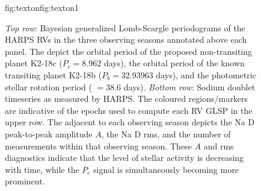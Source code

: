\begin{figure}
\begin{ocg}{fig:texton}{fig:texton}{1}
  \end{ocg}
  \hspace{-\hsize}%
  \caption[Temporal variations in the probability of the periodic signal at $P_c=8.962$ days and HARPS Na D timeseries
    over three observing seasons.]
    {\small \emph{Top row}: Bayesian generalized Lomb-Scargle periodograms of the HARPS RVs in the three observing
    seasons annotated above each panel. The
     depict
    the orbital period of the proposed non-transiting planet K2-18c ($P_c = 8.962$ days), the orbital period
    of the known transiting planet K2-18b ($P_b = 32.93963$ days), and the photometric stellar rotation period (\prot{}
    $= 38.6$ days). \emph{Bottom row}: Sodium doublet timeseries as measured by HARPS. The coloured regions/markers
    are indicative of the epochs used to compute each RV GLSP in the upper row. The 
     adjacent to each observing season
    depicts the Na D peak-to-peak amplitude $A$, the Na D rms, and the number of measurements within that observing season.
    These $A$ and rms diagnostics indicate that the level of stellar activity is decreasing with time, while the $P_c$ signal
    is simultaneously becoming more prominent.}
  \label{k2182fig:temporal}
\end{figure}


